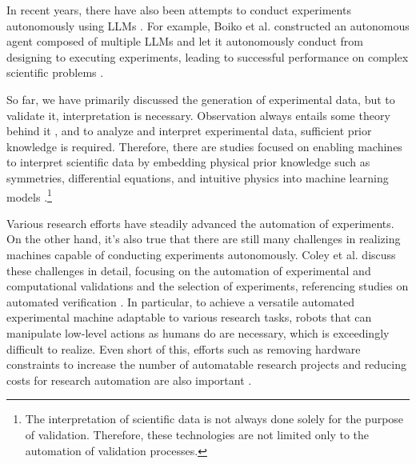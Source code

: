 In recent years, there have also been attempts to conduct experiments autonomously using LLMs \cite{boiko2023emergent,charness2023generation,qin2023gpt}. For example, Boiko et al. constructed an autonomous agent composed of multiple LLMs and let it autonomously conduct from designing to executing experiments, leading to successful performance on complex scientific problems \cite{boiko2023emergent}. 

So far, we have primarily discussed the generation of experimental data, but to validate it, interpretation is necessary. Observation always entails some theory behind it \cite{hanson1965patterns}, and to analyze and interpret experimental data, sufficient prior knowledge is required. Therefore, there are studies focused on enabling machines to interpret scientific data by embedding physical prior knowledge such as symmetries, differential equations, and intuitive physics into machine learning models \cite{hao2022physics,karniadakis2021physics}.\footnote{
The interpretation of scientific data is not always done solely for the purpose of validation. Therefore, these technologies are not limited only to the automation of validation processes.
}

Various research efforts have steadily advanced the automation of experiments. On the other hand, it's also true that there are still many challenges in realizing machines capable of conducting experiments autonomously. Coley et al. discuss these challenges in detail, focusing on the automation of experimental and computational validations and the selection of experiments, referencing studies on automated verification \cite{coley2020autonomousII}. In particular, to achieve a versatile automated experimental machine adaptable to various research tasks, robots that can manipulate low-level actions as humans do are necessary, which is exceedingly difficult to realize. Even short of this, efforts such as removing hardware constraints to increase the number of automatable research projects and reducing costs for research automation are also important \cite{coley2020autonomousII}.



